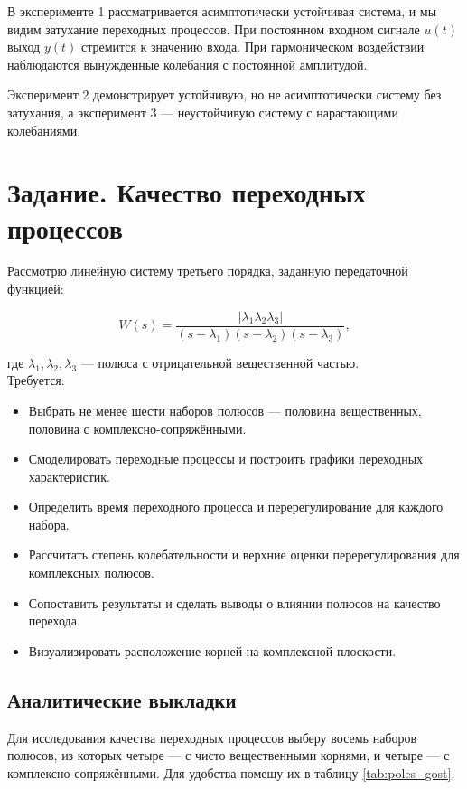 \documentclass[a4paper,12pt]{article}
\begin{document}
В эксперименте 1 рассматривается асимптотически устойчивая система, и мы видим затухание переходных процессов. При постоянном входном сигнале \(u(t)\) выход \(y(t)\) стремится к значению входа. При гармоническом воздействии наблюдаются вынужденные колебания с постоянной амплитудой.

Эксперимент 2 демонстрирует устойчивую, но не асимптотически систему без затухания, а эксперимент 3 — неустойчивую систему с нарастающими колебаниями.

	\newpage
	\section{Задание. Качество переходных процессов}
	
	Рассмотрю линейную систему третьего порядка, заданную передаточной функцией:
	
	\[
	W(s) = \frac{|\lambda_1 \lambda_2 \lambda_3|}{(s - \lambda_1)(s - \lambda_2)(s - \lambda_3)},
	\]
	
	где \(\lambda_1, \lambda_2, \lambda_3\) — полюса с отрицательной вещественной частью.\\

	Требуется:
	
	\begin{itemize}
		\item Выбрать не менее шести наборов полюсов — половина вещественных, половина с комплексно-сопряжёнными.
		\item Смоделировать переходные процессы и построить графики переходных характеристик.
		\item Определить время переходного процесса и перерегулирование для каждого набора.
		\item Рассчитать степень колебательности и верхние оценки перерегулирования для комплексных полюсов.
		\item Сопоставить результаты и сделать выводы о влиянии полюсов на качество перехода.
		\item Визуализировать расположение корней на комплексной плоскости.
	\end{itemize}
	
	\subsection{Аналитические выкладки}
	
	Для исследования качества переходных процессов выберу восемь наборов полюсов, из которых четыре — с чисто вещественными корнями, и четыре — с комплексно-сопряжёнными. Для удобства помещу их в таблицу \ref{tab:poles_gost}.
	
\end{document}
